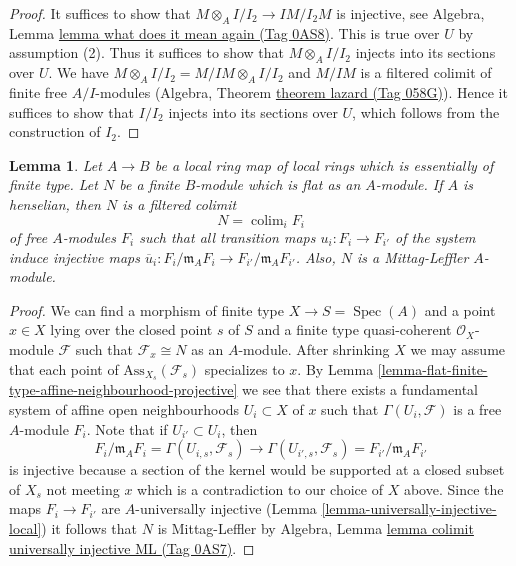 \documentclass{amsart}
\theoremstyle{plain}
\newtheorem{lemma}[subsection]{Lemma}
\theoremstyle{definition}
\theoremstyle{remark}
\numberwithin{equation}{subsection}
\def\colim{\mathop{\mathrm{colim}}\nolimits}
\def\Spec{\mathop{\mathrm{Spec}}}
\begin{document}
\begin{proof}
It suffices to show that
$M \otimes_A I/I_2 \to IM/I_2M$ is injective, see
Algebra, Lemma \href{https://stacks.math.columbia.edu/tag/0AS8}{lemma what does it mean again (Tag 0AS8)}.
This is true over $U$ by assumption (2). Thus it suffices to show
that $M \otimes_A I/I_2$ injects into its sections over $U$.
We have $M \otimes_A I/I_2 = M/IM \otimes_A I/I_2$ and
$M/IM$ is a filtered colimit of finite free $A/I$-modules
(Algebra, Theorem \href{https://stacks.math.columbia.edu/tag/058G}{theorem lazard (Tag 058G)}).
Hence it suffices to show that $I/I_2$ injects into its sections
over $U$, which follows from the construction of $I_2$.
\end{proof}


\begin{lemma}
\label{lemma-flat-finite-type-local-colimit-free}
Let $A \to B$ be a local ring map of local rings which is essentially of
finite type. Let $N$ be a finite $B$-module which is flat as an $A$-module.
If $A$ is henselian, then $N$ is a filtered colimit
$$
N = \colim_i F_i
$$
of free $A$-modules $F_i$ such that all transition maps
$u_i : F_i \to F_{i'}$ of the system induce injective maps
$\overline{u}_i : F_i/\mathfrak m_AF_i \to F_{i'}/\mathfrak m_AF_{i'}$.
Also, $N$ is a Mittag-Leffler $A$-module.
\end{lemma}

\begin{proof}
We can find a morphism of finite type $X \to S = \Spec(A)$
and a point $x \in X$ lying over the closed point $s$ of $S$ and a finite
type quasi-coherent $\mathcal{O}_X$-module $\mathcal{F}$ such that
$\mathcal{F}_x \cong N$ as an $A$-module. After shrinking $X$
we may assume that each point of $\text{Ass}_{X_s}(\mathcal{F}_s)$ specializes
to $x$. By
Lemma \ref{lemma-flat-finite-type-affine-neighbourhood-projective}
we see that there exists a fundamental system of affine open neighbourhoods
$U_i \subset X$ of $x$ such that $\Gamma(U_i, \mathcal{F})$ is
a free $A$-module $F_i$. Note that if $U_{i'} \subset U_i$, then
$$
F_i/\mathfrak m_AF_i = \Gamma(U_{i, s}, \mathcal{F}_s)
\longrightarrow
\Gamma(U_{i', s}, \mathcal{F}_s) = F_{i'}/\mathfrak m_AF_{i'}
$$
is injective because a section of the kernel would be supported at
a closed subset of $X_s$ not meeting $x$ which is a contradiction
to our choice of $X$ above. Since the maps $F_i \to F_{i'}$ are
$A$-universally injective (Lemma \ref{lemma-universally-injective-local})
it follows that $N$ is
Mittag-Leffler by
Algebra, Lemma \href{https://stacks.math.columbia.edu/tag/0AS7}{lemma colimit universally injective ML (Tag 0AS7)}.
\end{proof}
\end{document}
